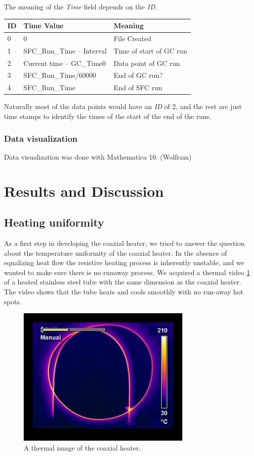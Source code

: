 \documentclass[aip,rsi,preprint,graphicx]{revtex4-1} %
\begin{document}
The meaning of the {\it Time} field depends on the {\it ID}.

\begin{table}
\begin{tabular}{|l|l|l|}
\hline
ID & Time Value & Meaning \\
\hline
0 & 0 & File Created \\
1 & SFC\_Run\_Time – Interval & Time of start of GC run \\
2 & Current time – GC\_Time0 & Data point of GC run \\
3 & SFC\_Run\_Time/60000 & End of GC run? \\
4 & SFC\_Run\_Time & End of SFC run \\
\hline
\end{tabular}
\end{table}

Naturally most of the data points would have an {\it ID} of 2, and the rest are just time stamps to identify the times of the start of the end of the runs. 

\subsubsection{Data visualization}
Data visualization was done with Mathematica 10. (Wolfram)

\section{Results and Discussion}

\subsection{Heating uniformity}

As a first step in developing the coaxial heater, we tried to answer the question about the temperature uniformity of the coaxial heater. In the absence of equalizing heat flow the resistive heating process is inherently unstable, and we wanted to make sure there is no runaway process. We acquired a thermal video \ref{fig:ThermImg} of a heated stainless steel tube with the same dimension as the coaxial heater. The video shows that the tube heats and cools smoothly with no run-away hot spots.
\begin{figure}
\includegraphics[width=8.5cm]{thermal_image}%
\caption{\label{fig:ThermImg}A thermal image of the coaxial heater.}%
\end{figure}
\end{document}
